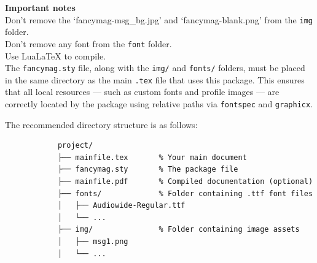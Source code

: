 \documentclass[10pt,twoside]{article}
\begin{document}
{\begin{tcolorbox}[colback=blue!5!white, width=\textwidth, opacityfill=0.1]
  	 	\end{tcolorbox}
  	 	\newpage
  	 	{\fontsize{15}{15}\selectfont \textbf{\textcolor{accent}{\textsf{{Important notes}}}}}\\
  	 	\bullet Don't remove the `fancymag-msg\_bg.jpg' and `fancymag-blank.png' from the \texttt{img} folder.\\
  	 	\bullet Don't remove any font from the \texttt{font} folder.\\
  	 	\bullet Use LuaLaTeX to compile.\\
  	 	\bullet The \texttt{fancymag.sty} file, along with the \texttt{img/} and \texttt{fonts/} folders, must be placed in the same directory as the main \texttt{.tex} file that uses this package. This ensures that all local resources — such as custom fonts and profile images — are correctly located by the package using relative paths via \texttt{fontspec} and \texttt{graphicx}.
  	 	
  	 	The recommended directory structure is as follows:
  	 	
  	 	\begin{verbatim}
  	 		project/
  	 		├── mainfile.tex       % Your main document
  	 		├── fancymag.sty       % The package file
  	 		├── mainfile.pdf       % Compiled documentation (optional)
  	 		├── fonts/             % Folder containing .ttf font files
  	 		│   ├── Audiowide-Regular.ttf
  	 		│   └── ...
  	 		├── img/               % Folder containing image assets
  	 		│   ├── msg1.png
  	 		│   └── ...
  	 	\end{verbatim}


 
}
\end{document}
